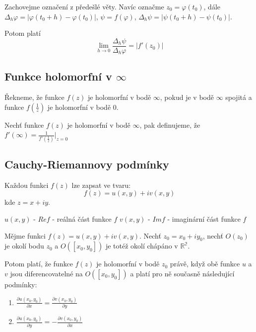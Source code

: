 \begin{theorem}
Zachovejme označení z předešlé věty. Navíc označme $z_0=\varphi(t_0)$, dále $\Delta_h\varphi=|\varphi(t_0+h)-\varphi(t_0)|$, $\psi = f(\varphi)$, $\Delta_h\psi=|\psi(t_0+h)-\psi(t_0)|$.

Potom platí $$\lim_{h\to 0}\frac{\Delta_h\psi}{\Delta_h\varphi}=|f'(z_0)|$$
\end{theorem}

\subsection{Funkce holomorfní v $\infty$}
\begin{definition}
Řekneme, že funkce $f(z)$ je holomorfní v bodě $\infty$, pokud je v bodě $\infty$ spojitá a funkce $f(\frac{1}{z})$ je holomorfní v bodě $0$.
\end{definition}

\begin{definition}
Nechť funkce $f(z)$ je holomorfní v bodě $\infty$, pak definujeme, že $f'(\infty)=\frac{1}{f'(\frac{1}{z})}|_{z=0}$
\end{definition}

\subsection{Cauchy-Riemannovy podmínky}
\begin{definition}
Každou funkci $f(z)$ lze zapsat ve tvaru: $$f(z)=u(x,y)+i v(x,y)$$ kde $z=x+iy$. 

$u(x,y)$ - $Re f$ - reálná část funkce $f$
$v(x,y)$ - $Im f$ - imaginární část funkce $f$
\end{definition}

\begin{theorem}
Mějme funkci $f(z)=u(x,y)+i v(x,y)$. Nechť $z_0=x_0+i y_0$, nechť $O(z_0)$ je okolí bodu $z_0$ a $O([x_0,y_0])$ je totéž okolí chápáno v $\mathbb{R^2}$.

Potom platí, že funkce $f(z)$ je holomorfní v bodě $z_0$ právě, když obě funkce $u$ a $v$ jsou diferencovatelné na $O([x_0,y_0])$ a platí pro ně současně následující podmínky:
\begin{enumerate}
\item $\frac{\partial u(x_0,y_0)}{\partial x}=\frac{\partial v(x_0,y_0)}{\partial y}$
\item $\frac{\partial u(x_0,y_0)}{\partial y}=-\frac{\partial v(x_0,y_0)}{\partial x}$
\end{enumerate}
\end{theorem}

